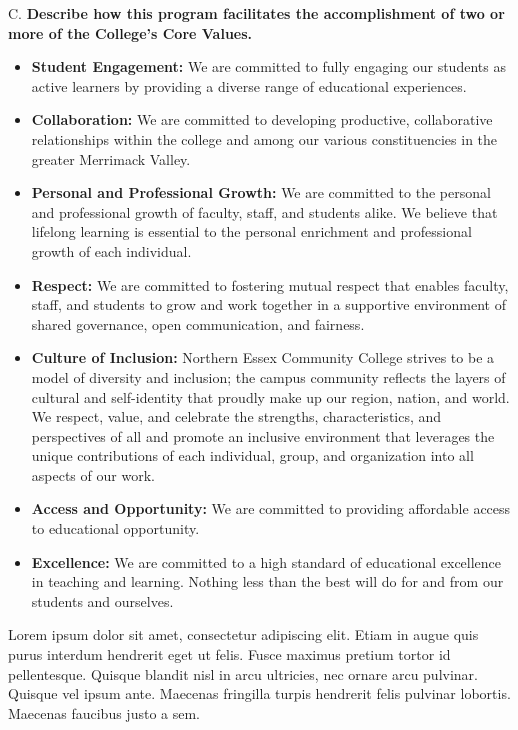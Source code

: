 C. \textbf{Describe how this program facilitates the accomplishment of two or more of the College’s Core Values. \footnotemark }
\begin{itemize}
    \item \textbf{Student Engagement:} We are committed to fully engaging our students as active learners by providing a diverse range of educational experiences.
    \item \textbf{Collaboration:} We are committed to developing productive, collaborative relationships within the college and among our various constituencies in the greater Merrimack Valley.
    \item \textbf{Personal and Professional Growth:} We are committed to the personal and professional growth of faculty, staff, and students alike. We believe that lifelong learning is essential to the personal enrichment and professional growth of each individual.
    \item \textbf{Respect:} We are committed to fostering mutual respect that enables faculty, staff, and students to grow and work together in a supportive environment of shared governance, open communication, and fairness.
    \item \textbf{Culture of Inclusion:} Northern Essex Community College strives to be a model of diversity and inclusion; the campus community reflects the layers of cultural and self-identity that proudly make up our region, nation, and world. We respect, value, and celebrate the strengths, characteristics, and perspectives of all and promote an inclusive environment that leverages the unique contributions of each individual, group, and organization into all aspects of our work.
    \item \textbf{Access and Opportunity:} We are committed to providing affordable access to educational opportunity.
    \item \textbf{Excellence:} We are committed to a high standard of educational excellence in teaching and learning. Nothing less than the best will do for and from our students and ourselves.
\end{itemize}







Lorem ipsum dolor sit amet, consectetur adipiscing elit. Etiam in augue quis purus interdum hendrerit eget ut felis. Fusce maximus pretium tortor id pellentesque. Quisque blandit nisl in arcu ultricies, nec ornare arcu pulvinar. Quisque vel ipsum ante. Maecenas fringilla turpis hendrerit felis pulvinar lobortis. Maecenas faucibus justo a sem. 








